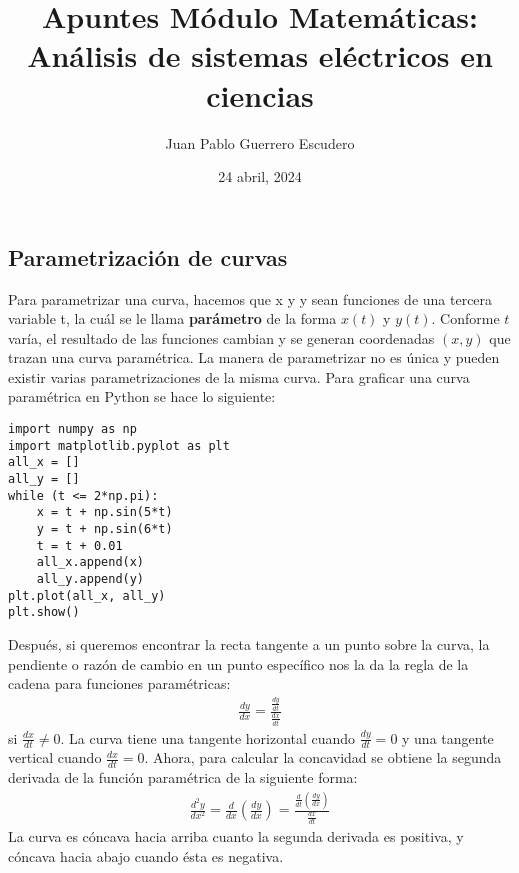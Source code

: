 \documentclass[12pt, letterpaper]{report}
\title{Apuntes Módulo Matemáticas: Análisis de sistemas eléctricos en ciencias}
\author{Juan Pablo Guerrero Escudero}
\date{24 abril, 2024}
\begin{document}
\maketitle
\subsection*{Parametrización de curvas} 
Para parametrizar una curva, hacemos que x y y sean funciones de una tercera variable t, la cuál se le llama \textbf{parámetro} de la forma 
$x(t)$ y $y(t)$. Conforme $t$ varía, el resultado de las funciones cambian y se generan coordenadas $(x, y)$ que trazan una curva 
paramétrica. La manera de parametrizar no es única y pueden existir varias parametrizaciones de la misma curva. Para graficar una curva paramétrica en Python se hace lo siguiente: 
\begin{verbatim}
import numpy as np 
import matplotlib.pyplot as plt
all_x = []
all_y = []
while (t <= 2*np.pi): 
    x = t + np.sin(5*t)
    y = t + np.sin(6*t)
    t = t + 0.01
    all_x.append(x)
    all_y.append(y)
plt.plot(all_x, all_y)
plt.show()
\end{verbatim}
Después, si queremos encontrar la recta tangente a un punto sobre la curva, la pendiente o razón de cambio en un punto específico nos la 
da la regla de la cadena para funciones paramétricas: 
\begin{align}
\frac{dy}{dx} = \frac{\frac{dy}{dt}}{\frac{dx}{dt}} 
\end{align}si $\frac{dx}{dt} \neq 0$. La curva tiene una tangente horizontal cuando $\frac{dy}{dt} = 0$ y una tangente vertical cuando 
$\frac{dx}{dt} = 0$. Ahora, para calcular la concavidad se obtiene la segunda derivada de la función paramétrica de la siguiente forma: 
\begin{align}
\frac{d^2y}{dx^2} = \frac{d}{dx}(\frac{dy}{dx}) = \frac{\frac{d}{dt}(\frac{dy}{dx})}{\frac{dx}{dt}}
\end{align}La curva es cóncava hacia arriba cuanto la segunda derivada es positiva, y cóncava hacia abajo cuando ésta es negativa.    \\
\end{document}
